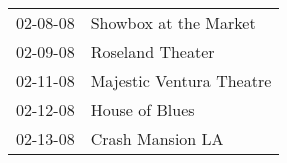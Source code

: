 \begin{supertabular}{p{0.25\columnwidth}p{0.75\columnwidth}}
 02-08-08 &     Showbox at the Market \\
 02-09-08 &          Roseland Theater \\
 02-11-08 &  Majestic Ventura Theatre \\
 02-12-08 &            House of Blues \\
 02-13-08 &          Crash Mansion LA \\
\end{supertabular}
